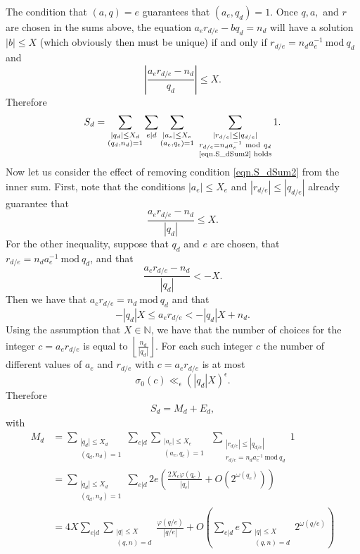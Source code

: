 \documentclass[reqno]{amsart}
\newcommand{\N}{\mathbb{N}}
\begin{document}
The condition that $(a,q)=e$ guarantees that $(a_e,q_d)=1$. Once $q, a,$ and $r$ are chosen in the sums above, the equation $a_er_{d/e}-bq_d=n_d$ will have a solution $|b|\le X$ (which obviously then must be unique) if and only if $r_{d/e}=n_da_e^{-1}~\mathrm{mod}~q_d$ and
\begin{equation}\label{eqn.S_dSum2}
\left|\frac{a_er_{d/e}-n_d}{q_d}\right|\le X.
\end{equation}
Therefore 
\begin{align*}
	S_d=\sum_{\substack{|q_d|\le X_d\\(q_d,n_d)=1}}\sum_{e|d}\sum_{\substack{|a_e|\le X_e\\(a_e,q_e)=1}}~\sum_{\substack{|r_{d/e}|\le|q_{d/e}|\\r_{d/e}=n_da_e^{-1}~\mathrm{mod}~q_d\\\text{\eqref{eqn.S_dSum2} holds}}}1.
\end{align*}
Now let us consider the effect of removing condition \eqref{eqn.S_dSum2} from the inner sum. First, note that the conditions $|a_e|\le X_e$ and $|r_{d/e}|\le |q_{d/e}|$ already guarantee that 
\begin{equation*}
	\frac{a_er_{d/e}-n_d}{|q_d|}\le X.
\end{equation*}
For the other inequality, suppose that $q_d$ and $e$ are chosen, that $r_{d/e}=n_da_e^{-1}~\mathrm{mod}~q_d$, and that
\begin{equation*}
	\frac{a_er_{d/e}-n_d}{|q_d|}< -X.
\end{equation*}
Then we have that $a_er_{d/e}=n_d~\mathrm{mod}~q_d$ and that
\begin{equation*}
	-|q_d|X\le a_er_{d/e}< -|q_d|X+n_d.
\end{equation*}
Using the assumption that $X\in\N$, we have that the number of choices for the integer $c=a_er_{d/e}$ is equal to $\left\lfloor\frac{n_d}{|q_d|}\right\rfloor$. For each such integer $c$ the number of different values of $a_e$ and $r_{d/e}$ with $c=a_er_{d/e}$ is at most
\[\sigma_0(c)\ll_\epsilon \left(|q_d|X\right)^\epsilon.\]
Therefore
\begin{align*}
	S_d=M_d+E_d,
\end{align*}
with
\begin{align}
	M_d&=\sum_{\substack{|q_d|\le X_d\\(q_d,n_d)=1}}\sum_{e|d}\sum_{\substack{|a_e|\le X_e\\(a_e,q_e)=1}}~\sum_{\substack{|r_{d/e}|\le|q_{d/e}|\\r_{d/e}=n_da_e^{-1}~\mathrm{mod}~q_d}}1\nonumber\\
	&=\sum_{\substack{|q_d|\le X_d\\(q_d,n_d)=1}}\sum_{e|d}2e\left(\frac{2X_e\varphi(q_e)}{|q_e|}+O\left(2^{\omega(q_e)}\right)\right)\nonumber\\
	&=4X\sum_{e|d}\sum_{\substack{|q|\le X\\(q,n)=d}}\frac{\varphi(q/e)}{|q/e|}+O\left(\sum_{e|d}e\sum_{\substack{|q|\le X\\(q,n)=d}}2^{\omega(q/e)}\right)\label{eqn.S_dSum3}
\end{align}
\end{document}
